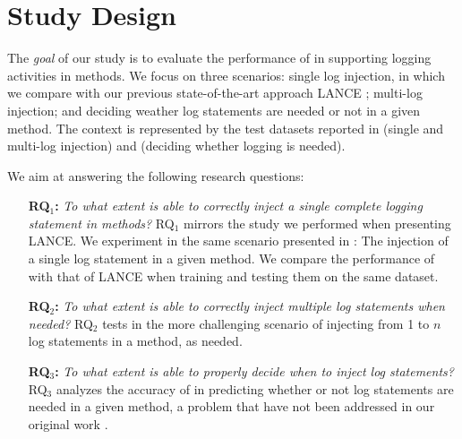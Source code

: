 \section{Study Design} \label{sec:design}

The \emph{goal} of our study is to evaluate the performance of \approach in supporting logging activities in \java methods. We focus on three scenarios: single log injection, in which we compare with our previous state-of-the-art approach LANCE \cite{mastropaolo2022using}; multi-log injection; and deciding weather log statements are needed or not in a given \java method. The context is represented by the test datasets reported in  (single and multi-log injection) and  (deciding whether logging is needed).

We aim at answering the following research questions:

\begin{itemize}[itemindent=0.3cm]

\item[\textbf{RQ$_1$:}]\textit{To what extent is \approach able to correctly inject a single complete logging statement in \java methods?} RQ$_1$ mirrors the study we performed when presenting LANCE. We experiment \approach in the same scenario presented in \cite{mastropaolo2022using}: The injection of a single log statement in a given \java method. We compare the performance of \approach with that of LANCE when training and testing them on the same dataset. 

\item[\textbf{RQ$_2$:}]\textit{To what extent is \approach able to correctly inject multiple log statements when needed?} RQ$_2$ tests \approach in the more challenging scenario of injecting from 1 to $n$ log statements in a \java method, as needed.

\item[\textbf{RQ$_3$:}]\textit{To what extent is \approach able to properly decide when to inject log statements?} RQ$_3$ analyzes the accuracy of \approach in predicting whether or not log statements are needed in a given \java method, a problem that have not been addressed in our original work \cite{mastropaolo2022using}.

\end{itemize}

